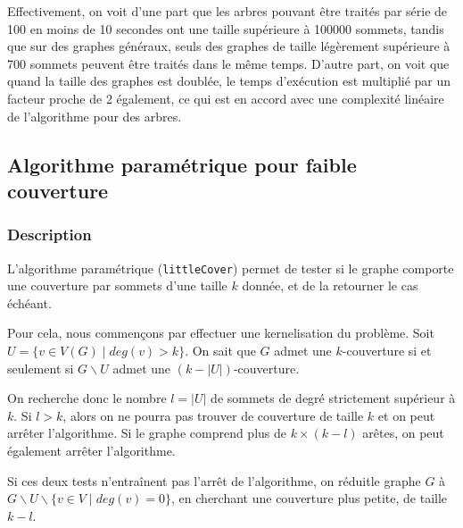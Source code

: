 \documentclass[a4paper,10pt]{article}
\begin{document}
Effectivement, on voit d'une part que les arbres pouvant être traités par série de 100 en moins de 10 secondes ont une taille supérieure à 100000 sommets, tandis que sur des graphes généraux, seuls des graphes de taille légèrement supérieure à 700 sommets peuvent être traités dans le même temps. D'autre part, on voit que quand la taille des graphes est doublée, le temps d'exécution est multiplié par un facteur proche de 2 également, ce qui est en accord avec une complexité linéaire de l'algorithme pour des arbres.


\subsection{Algorithme paramétrique pour faible couverture}

\subsubsection{Description}

L'algorithme paramétrique (\texttt{littleCover}) permet de tester si le graphe comporte une couverture par sommets d'une taille $k$ donnée, et de la retourner le cas échéant.

\bigskip
Pour cela, nous commençons par effectuer une kernelisation du problème. Soit $U = \{ v \in V(G) \mid deg(v) > k\}$. On sait que $G$ admet une $k$-couverture si et seulement si $G \smallsetminus U$ admet une $(k - |U|)$-couverture.

On recherche donc le nombre $l = |U|$ de sommets de degré strictement supérieur à $k$. 
Si $l > k$, alors on ne pourra pas trouver de couverture de taille $k$ et on peut arrêter l'algorithme.
Si le graphe comprend plus de $k\times(k-l)$ arêtes, on peut également arrêter l'algorithme.

Si ces deux tests n'entraînent pas l'arrêt de l'algorithme, on \og réduit\fg le graphe $G$ à $G \smallsetminus U \smallsetminus \{v \in V \mid deg(v) = 0\}$, en cherchant une couverture plus petite, de taille $k-l$.
\end{document}
